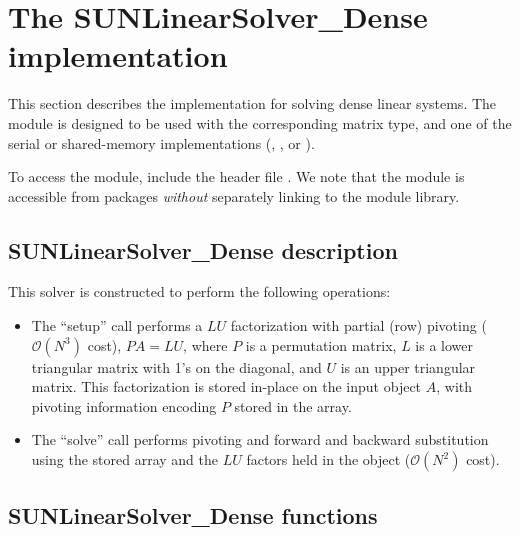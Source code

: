 \section{The SUNLinearSolver\_Dense implementation}
\label{ss:sunlinsol_dense}

This section describes the {\sunlinsol} implementation for solving dense linear
systems. The {\sunlinsoldense} module is designed to be used with the
corresponding {\sunmatdense} matrix type, and one of the serial or
shared-memory {\nvector} implementations ({\nvecs}, {\nvecopenmp}, or
{\nvecpthreads}).

To access the {\sunlinsoldense} module, include the header file
. We note that the {\sunlinsoldense} module is
accessible from {\sundials} packages \textit{without} separately linking to
the  module library.


\subsection{SUNLinearSolver\_Dense description}
\label{ss:sunlinsol_dense_description}

This solver is constructed to perform the following operations:
\begin{itemize}
\item The ``setup'' call performs a $LU$ factorization with
  partial (row) pivoting ($\mathcal O(N^3)$ cost), $PA=LU$, where $P$
  is a permutation matrix, $L$ is a lower triangular matrix with 1's
  on the diagonal, and $U$ is an upper triangular matrix.  This
  factorization is stored in-place on the input {\sunmatdense} object
  $A$, with pivoting information encoding $P$ stored in
  the  array.
\item The ``solve'' call performs pivoting and forward and
  backward substitution using the stored  array and the
  $LU$ factors held in the {\sunmatdense} object ($\mathcal O(N^2)$
  cost).
\end{itemize}


\subsection{SUNLinearSolver\_Dense functions}
\label{ss:sunlinsol_dense_functions}

